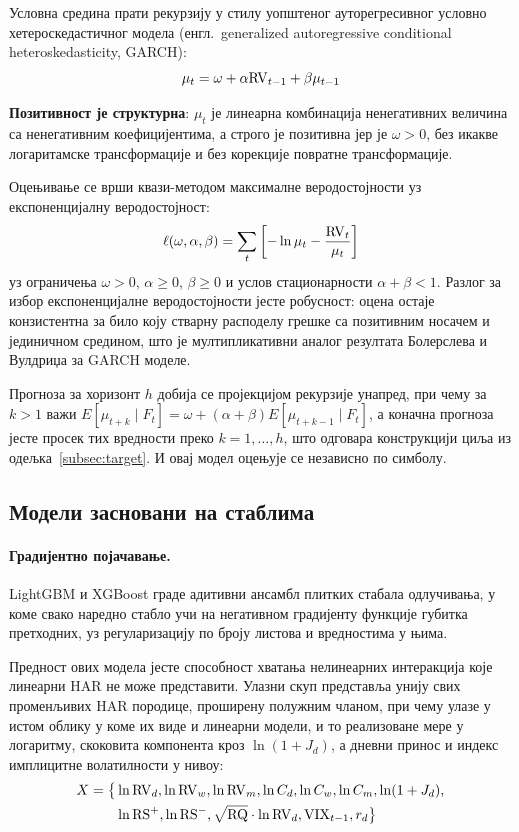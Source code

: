 Условна средина прати рекурзију у стилу уопштеног ауторегресивног условно
хетероскедастичног модела (енгл.\ generalized autoregressive conditional
heteroskedasticity, GARCH):
\begin{equation}
\mu_t = \omega + \alpha\mathrm{RV}_{t-1} + \beta\mu_{t-1}
\label{eq:mem}
\end{equation}

\textbf{Позитивност је структурна}: $\mu_t$ је линеарна комбинација ненегативних
величина са ненегативним коефицијентима, а строго је позитивна јер је $\omega > 0$,
без икакве логаритамске трансформације и без корекције повратне трансформације.

Оцењивање се врши квази-методом максималне веродостојности уз експоненцијалну
веродостојност:
\begin{equation}
\ell(\omega,\alpha,\beta) = \sum_{t}\left[-\ln\mu_t - \frac{\mathrm{RV}_t}{\mu_t}\right]
\end{equation}
уз ограничења $\omega > 0$, $\alpha \ge 0$, $\beta \ge 0$ и услов стационарности
$\alpha + \beta < 1$. Разлог за избор експоненцијалне веродостојности јесте робусност:
оцена остаје конзистентна за било коју стварну расподелу грешке са позитивним носачем
и јединичном средином, што је мултипликативни аналог резултата Болерслева и Вулдриџа
\parencite{bollerslevWooldridge1992} за GARCH моделе.

Прогноза за хоризонт $h$ добија се пројекцијом рекурзије унапред, при чему за $k > 1$
важи $E[\mu_{t+k}\mid F_t] = \omega + (\alpha+\beta)E[\mu_{t+k-1}\mid F_t]$, а коначна
прогноза јесте просек тих вредности преко $k = 1,\dots,h$, што одговара конструкцији
циља из одељка~\ref{subsec:target}. И овај модел оцењује се независно по
симболу.

\subsection{Модели засновани на стаблима}
\label{subsec:stabla}

\paragraph{Градијентно појачавање.}
LightGBM \parencite{ke2017} и XGBoost \parencite{chenGuestrin2016} граде адитивни
ансамбл плитких стабала одлучивања, у коме свако наредно стабло учи на негативном
градијенту функције губитка претходних, уз регуларизацију по броју листова и
вредностима у њима.

Предност ових модела јесте способност хватања нелинеарних интеракција које линеарни
HAR не може представити. Улазни скуп представља унију свих променљивих HAR породице,
проширену полужним чланом, при чему улазе у истом облику у коме их виде и линеарни
модели, и то реализоване мере у логаритму, скоковита компонента кроз $\ln(1 + J_d)$, а
дневни принос и индекс имплицитне волатилности у нивоу:
\begin{equation}
\begin{split}
X = \big\{& \ln\mathrm{RV}_d, \ln\mathrm{RV}_w, \ln\mathrm{RV}_m, \ln C_d, \ln C_w, \ln C_m,
\ln(1 + J_d), \\
& \ln\mathrm{RS}^{+}, \ln\mathrm{RS}^{-}, \sqrt{\mathrm{RQ}}\cdot\ln\mathrm{RV}_d, \mathrm{VIX}_{t-1}, r_d\big\}
\end{split}
\end{equation}

